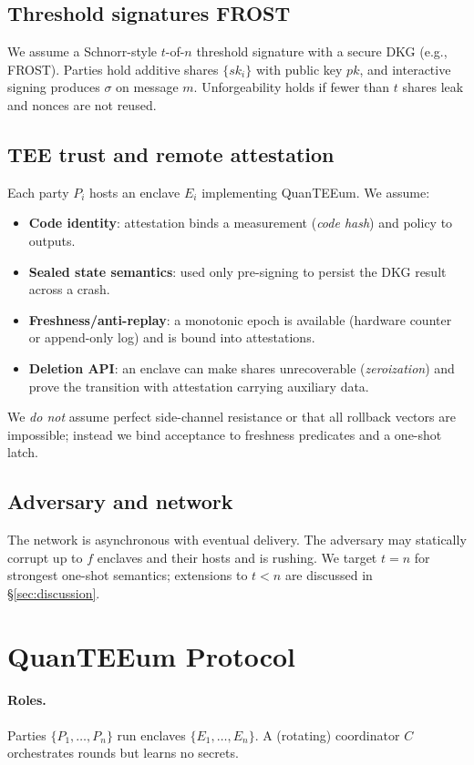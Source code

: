 \documentclass[runningheads,orivec]{llncs}
\newcommand{\prot}{\textsf{QuanTEEum}}
\newcommand{\FROST}{\textsf{FROST}}
\newcommand{\cFROST}{\FROST{}~\cite{komlo2020frost}}
\begin{document}
\subsection{Threshold signatures \cFROST{}}
We assume a Schnorr-style $t$-of-$n$ threshold signature with a secure DKG (e.g., \FROST{}). Parties hold additive shares $\{sk_i\}$ with public key $pk$, and interactive signing produces $\sigma$ on message $m$. Unforgeability holds if fewer than $t$ shares leak and nonces are not reused.

\subsection{TEE trust and remote attestation}
Each party $P_i$ hosts an enclave $E_i$ implementing \prot{}. We assume:
\begin{itemize}[leftmargin=*,itemsep=0.25em]
  \item \textbf{Code identity}: attestation binds a measurement (\emph{code hash}) and policy to outputs.
  \item \textbf{Sealed state semantics}: used only pre-signing to persist the DKG result across a crash.
  \item \textbf{Freshness/anti-replay}: a monotonic epoch is available (hardware counter or append-only log) and is bound into attestations.
  \item \textbf{Deletion API}: an enclave can make shares unrecoverable (\emph{zeroization}) and prove the transition with attestation carrying auxiliary data.
\end{itemize}
We \emph{do not} assume perfect side-channel resistance or that all rollback vectors are impossible; instead we bind acceptance to freshness predicates and a one-shot latch.

\subsection{Adversary and network}
The network is asynchronous with eventual delivery. The adversary may statically corrupt up to $f$ enclaves and their hosts and is rushing. We target $t=n$ for strongest one-shot semantics; extensions to $t<n$ are discussed in \S\ref{sec:discussion}.

\section{\prot{} Protocol}\label{sec:protocol}
\paragraph{Roles.} Parties $\{P_1,\dots,P_n\}$ run enclaves $\{E_1,\dots,E_n\}$. A (rotating) coordinator $C$ orchestrates rounds but learns no secrets.
\end{document}
